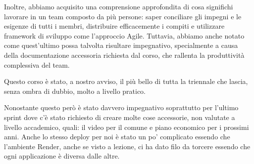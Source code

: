 \vspace{0.5cm}

Inoltre, abbiamo acquisito una comprensione approfondita di cosa significhi lavorare in un team composto da più persone: saper conciliare gli impegni e le esigenze di tutti i membri, distribuire efficacemente i compiti e utilizzare framework di sviluppo come l'approccio Agile.
Tuttavia, abbiamo anche notato come quest'ultimo possa talvolta risultare impegnativo, specialmente a causa della documentazione accessoria richiesta dal corso, che rallenta la produttività complessiva del team.

\vspace{0.5cm}

Questo corso è stato, a nostro avviso, il più bello di tutta la triennale che lascia, senza ombra di dubbio, molto a livello pratico.

Nonostante questo però è stato davvero impegnativo soprattutto per l'ultimo sprint dove c'è stato richiesto di creare molte cose accessorie, non valutate a livello accademico, quali: il video per il comune e piano economico per i prossimi anni.
Anche lo stesso deploy per noi è stato un po' complicato essendo che l'ambiente Render, anche se visto a lezione, ci ha dato filo da torcere essendo che ogni applicazione è diversa dalle altre.




